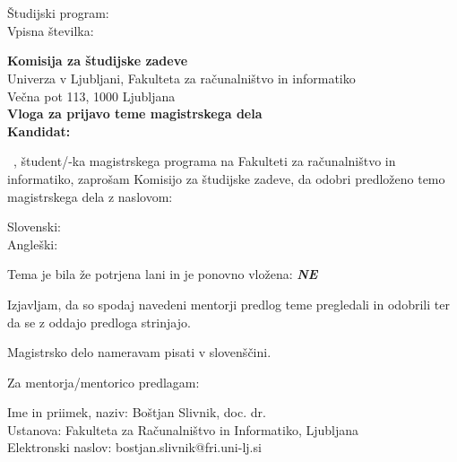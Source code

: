 \documentclass[a4paper, 12pt]{article}
\begin{document}


\newcommand{\Kandidat}{\ImeKandidata~\PriimekKandidata}
\noindent
\Kandidat\\
\NaslovBivalisca \\
Študijski program: \StudijskiProgram \\
Vpisna številka: \VpisnaStevilka
\bigskip

{\bf Komisija za študijske zadeve}\\
Univerza v Ljubljani, Fakulteta za računalništvo in informatiko\\
Večna pot 113, 1000 Ljubljana\\

{\Large\bf
{\centering
    Vloga za prijavo teme magistrskega dela \\%
\large Kandidat: \Kandidat \\[10mm]}}


\Kandidat, študent/-ka magistrskega programa na Fakulteti za računalništvo in informatiko, zaprošam Komisijo za študijske zadeve, da odobri predloženo temo magistrskega dela z naslovom:

Slovenski: {\bf \SLONaslov}\\
Angleški: {\bf \ENGNaslov}

Tema je bila že potrjena lani in je ponovno vložena: {\bf \textit{NE} }

Izjavljam, da so spodaj navedeni mentorji predlog teme pregledali in odobrili ter da se z oddajo predloga strinjajo.

Magistrsko delo nameravam pisati v slovenščini.

Za mentorja/mentorico predlagam:

\hfill\begin{minipage}{\dimexpr\textwidth-2cm}
Ime in priimek, naziv: Boštjan Slivnik, doc. dr. \\
Ustanova: Fakulteta za Računalništvo in Informatiko, Ljubljana \\
Elektronski naslov: bostjan.slivnik@fri.uni-lj.si
\end{minipage}

\hfill


\end{document}
